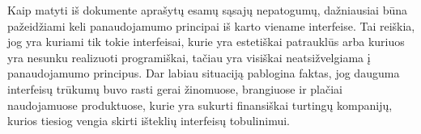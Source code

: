 Kaip matyti iš dokumente aprašytų esamų sąsajų nepatogumų, dažniausiai būna
pažeidžiami keli panaudojamumo principai iš karto viename interfeise. Tai
reiškia, jog yra kuriami tik tokie interfeisai, kurie yra estetiškai patrauklūs arba
kuriuos yra nesunku realizuoti programiškai, tačiau yra visiškai neatsižvelgiama į
panaudojamumo principus. Dar labiau situaciją pablogina faktas, jog dauguma
interfeisų trūkumų buvo rasti gerai žinomuose, brangiuose ir plačiai naudojamuose produktuose, 
kurie yra sukurti finansiškai turtingų kompanijų, kurios tiesiog vengia skirti išteklių
interfeisų tobulinimui.
